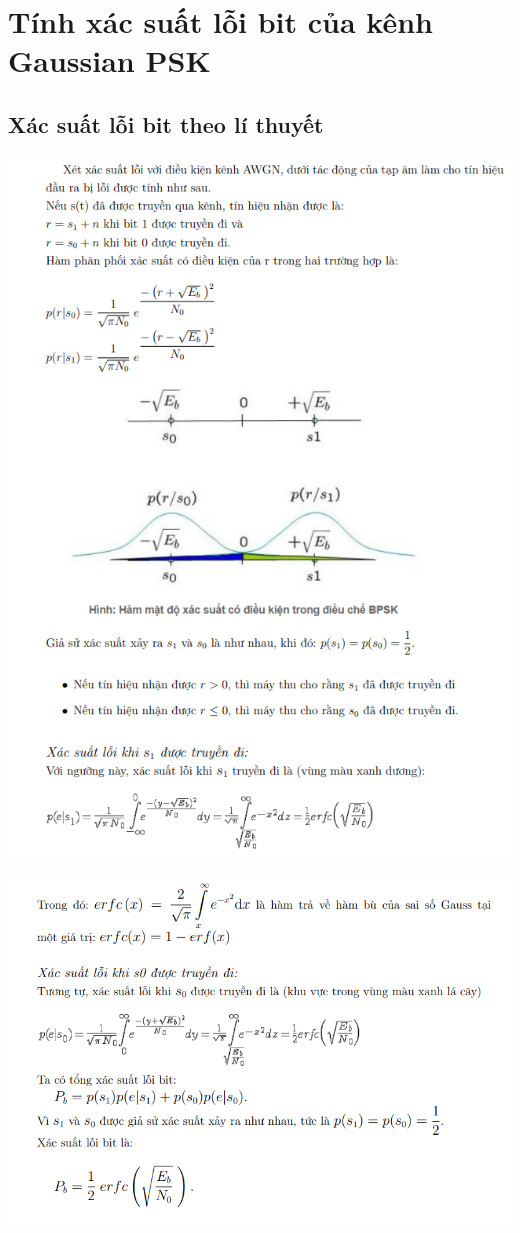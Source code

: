 {{\section{Tính xác suất lỗi bit của kênh Gaussian PSK}
\subsection{Xác suất lỗi bit theo lí thuyết}
\begin{center}
     \includegraphics[scale=1]{Img/tinhxacsuatloibitkenhGau.png}
\end{center}
\newpage
\begin{center}
     \includegraphics[scale=.8]{Img/tinhxacsuatloibitkenhGau2.png}
\end{center}
\newpage
}}
